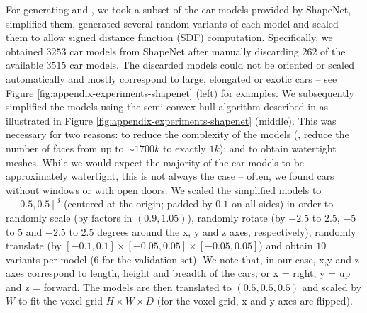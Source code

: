 \documentclass[10pt,letterpaper]{article}
\begin{document}
%
For generating \clean and \noisy, we took a subset of the car models provided by ShapeNet, simplified them, generated several random variants of each model and scaled them to allow signed distance function (SDF) computation. Specifically, we obtained $3253$ car models from ShapeNet \cite{Chang2015ARXIV} after manually discarding $262$ of the available $3515$ car models. The discarded models could not be oriented or scaled automatically and mostly correspond to large, elongated or exotic cars -- see Figure \ref{fig:appendix-experiments-shapenet} (left) for examples. We subsequently simplified the models using the semi-convex hull algorithm described in \cite{Guney2015CVPR} as illustrated in Figure \ref{fig:appendix-experiments-shapenet} (middle). This was necessary for two reasons: to reduce the complexity of the models (\ie, reduce the number of faces from up to $\sim 1700k$ to exactly $1k$); and to obtain watertight meshes. While we would expect the majority of the car models to be approximately watertight, this is not always the case -- often, we found cars without windows or with open doors. We scaled the simplified models to $[-0.5, 0.5]^3$ (centered at the origin; padded by $0.1$ on all sides) in order to randomly scale (by factors in $(0.9, 1.05)$), randomly rotate (by $-2.5$ to $2.5$, $-5$ to $5$ and $-2.5$ to $2.5$ degrees around the x, y and z axes, respectively), randomly translate (by $[-0.1,0.1] \times [-0.05,0.05] \times [-0.05,0.05]$) and obtain $10$ variants per model ($6$ for the validation set). We note that, in our case, x,y and z axes correspond to length, height and breadth of the cars; or x = right, y = up and z = forward. The models are then translated to $(0.5, 0.5, 0.5)$ and scaled by $W$ to fit the voxel grid $H \times W \times D$ (for the voxel grid, x and y axes are flipped).
\end{document}
